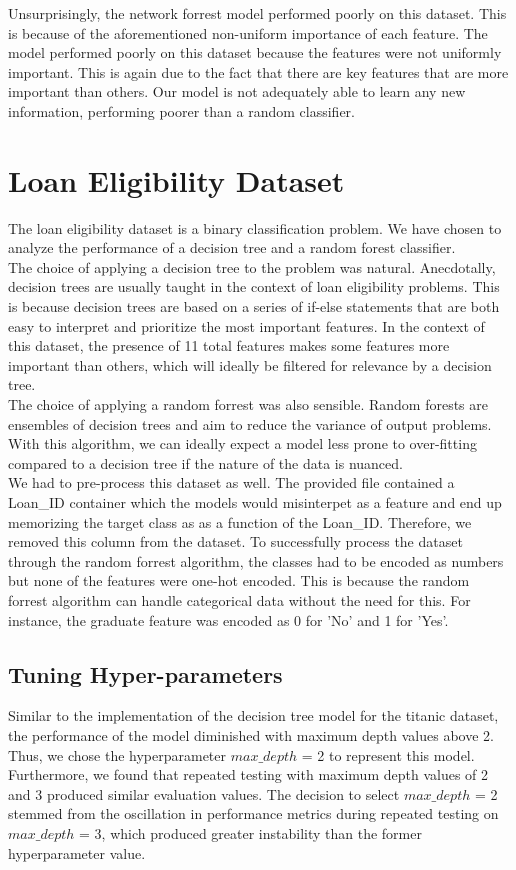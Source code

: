 \documentclass{article}
\begin{document}
Unsurprisingly, the network forrest model performed poorly on this dataset. This is because of the aforementioned non-uniform importance of each feature.
The model performed poorly on this dataset because the features were not uniformly important. This is again due to the fact that there are key features that are more important than others.
Our model is not adequately able to learn any new information, performing poorer than a random classifier.


\newpage
\section*{Loan Eligibility Dataset}
The loan eligibility dataset is a binary classification problem. We have chosen to analyze the performance of a decision tree and a random forest classifier.
\\

The choice of applying a decision tree to the problem was natural. Anecdotally, decision trees are usually taught in the context of loan eligibility problems. 
This is because decision trees are based on a series of if-else statements that are both easy to interpret and prioritize the most important features.
In the context of this dataset, the presence of 11 total features makes some features more important than others, which will ideally be filtered for relevance by a decision tree.
\\

The choice of applying a random forrest was also sensible. Random forests are ensembles of decision trees and aim to reduce the variance of output problems.
With this algorithm, we can ideally expect a model less prone to over-fitting compared to a decision tree if the nature of the data is nuanced.
\\

We had to pre-process this dataset as well. The provided file contained a Loan\_ID container which the models would misinterpet as a feature and end up memorizing the target class as
as a function of the Loan\_ID. Therefore, we removed this column from the dataset. To successfully process the dataset through the random forrest algorithm, the classes had to be encoded as numbers
but none of the features were one-hot encoded. This is because the random forrest algorithm can handle categorical data without the need for this. For instance, the graduate feature was encoded as 0 for 'No' and 1 for 'Yes'.

\subsection*{Tuning Hyper-parameters}
Similar to the implementation of the decision tree model for the titanic dataset,
the performance of the model diminished with maximum depth values above 2.
Thus, we chose the hyperparameter $max\_depth$ = 2 to represent this model.
Furthermore, we found that repeated testing with maximum depth values of 2 and 3
produced similar evaluation values.
The decision to select $max\_depth$ = 2 stemmed from the oscillation in performance
metrics during repeated testing on $max\_depth$ = 3, 
which produced greater instability than the former hyperparameter value. 
\\
\end{document}
